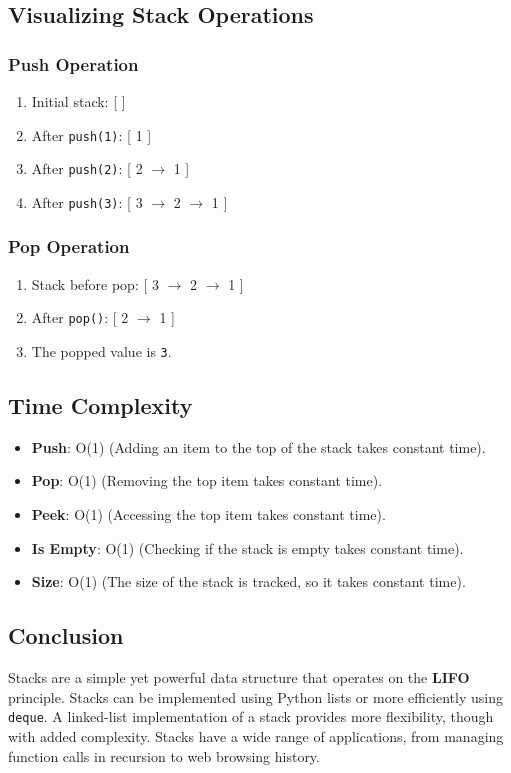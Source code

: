 \subsection{Visualizing Stack Operations}

\subsubsection*{Push Operation}
\begin{enumerate}
    \item Initial stack: [ ]
    \item After \texttt{push(1)}: [ 1 ]
    \item After \texttt{push(2)}: [ 2 $\rightarrow$ 1 ]
    \item After \texttt{push(3)}: [ 3 $\rightarrow$ 2 $\rightarrow$ 1 ]
\end{enumerate}

\subsubsection*{Pop Operation}
\begin{enumerate}
    \item Stack before pop: [ 3 $\rightarrow$ 2 $\rightarrow$ 1 ]
    \item After \texttt{pop()}: [ 2 $\rightarrow$ 1 ]
    \item The popped value is \texttt{3}.
\end{enumerate}

\subsection{Time Complexity}

\begin{itemize}
    \item \textbf{Push}: O(1) (Adding an item to the top of the stack takes constant time).
    \item \textbf{Pop}: O(1) (Removing the top item takes constant time).
    \item \textbf{Peek}: O(1) (Accessing the top item takes constant time).
    \item \textbf{Is Empty}: O(1) (Checking if the stack is empty takes constant time).
    \item \textbf{Size}: O(1) (The size of the stack is tracked, so it takes constant time).
\end{itemize}

\subsection{Conclusion}

Stacks are a simple yet powerful data structure that operates on the \textbf{LIFO} principle.
Stacks can be implemented using Python lists or more efficiently using \texttt{deque}.
A linked-list implementation of a stack provides more flexibility, though with added complexity.
Stacks have a wide range of applications, from managing function calls in recursion to web browsing history.

